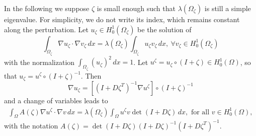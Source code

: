 \documentclass[11pt]{article}
\numberwithin{equation}{section}\newtheorem*{jepEnonce}{\jepEnonceTitle}\newenvironment{enonce*}[1]{\def\jepEnonceTitle{#1}\jepEnonce}{\endjepEnonce}\newtheorem*{conj*}{Conjecture}
\theoremstyle{plain}
\theoremstyle{definition}
\begin{document}
In the following we suppose $\zeta$ is small enough such that $\lambda(\Omega_\zeta)$ is still a simple eigenvalue. For simplicity, we do not write its index, which remains constant along the perturbation. Let $u_\zeta \in H_0^1(\Omega_\zeta)$ be the solution of
\begin{equation}
\int_{\Omega_\zeta} \nabla u_\zeta \cdot \nabla v_\zeta \, dx= \lambda (\Omega_\zeta) \int_{\Omega_\zeta} u_\zeta v_\zeta \,dx, \ \forall v_\zeta \in H_0^1(\Omega_\zeta)
\label{eq:eig-problem-moved}
\end{equation}
with the normalization $\int_{\Omega_\zeta} (u_\zeta)^2\, dx = 1$. Let $u^\zeta = u_\zeta\circ (I+\zeta)\in H_0^1(\Omega)$, so that $u_\zeta = u^\zeta\circ(I+\zeta)^{-1}$. Then
\begin{equation}
\nabla u_\zeta = [(I+D\zeta^T)^{-1}\nabla u^\zeta ] \circ (I+\zeta)^{-1}
\label{eq:change-var-grad}
\end{equation}
and a change of variables leads to
\begin{eqnarray}
\int_\Omega A(\zeta) \nabla u^\zeta \cdot \nabla v \,dx = \lambda(\Omega_\zeta) \int_\Omega u^\zeta v \det(I+D\zeta) \,dx, \text{ for all } v \in H_0^1(\Omega),
\label{eq:eig-problem-fixed}
\end{eqnarray}
with the notation $A(\zeta) = \det(I+D\zeta)(I+D\zeta)^{-1}(I+D\zeta^T)^{-1}$.
\end{document}
